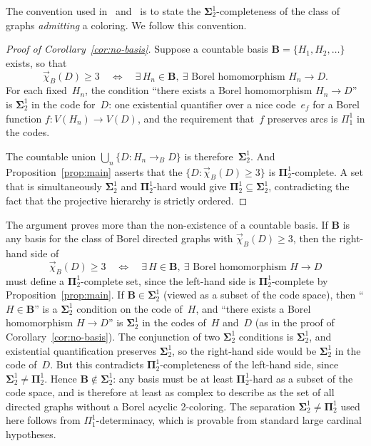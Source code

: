 \documentclass[12pt]{article}
\begin{document}
\begin{remark}\label{rmk:sigma-pi-convention}
The convention used in~\cite{Todorcevic_2021_ComplexProbBorel} and~\cite{thornton2022algebraic} is to state the $\mathbf\Sigma^1_2$-completeness of the class of graphs \emph{admitting} a coloring.
We follow this convention.
\end{remark}

\begin{proof}[Proof of Corollary~\ref{cor:no-basis}]
Suppose a countable basis $\mathbf{B} = \{H_1,H_2,\dots\}$ exists, so that
$$
	\vec\chi_B(D) \geq 3
	\quad\Longleftrightarrow\quad
	\exists\, H_n\in\mathbf{B},\ \exists\text{ Borel homomorphism } H_n\to D.
$$
For each fixed~$H_n$, the condition ``there exists a Borel homomorphism $H_n\to D$'' is $\mathbf\Sigma^1_2$ in the code for~$D$: one existential quantifier over a nice code~$e_f$ for a Borel function $f\colon V(H_n)\to V(D)$, and the requirement that~$f$ preserves arcs is $\Pi^1_1$ in the codes.

The countable union $\bigcup_n \{D : H_n\to_B D\}$ is therefore~$\mathbf\Sigma^1_2$.
And Proposition~\ref{prop:main} asserts that the $\{D : \vec\chi_B(D)\geq 3\}$ is $\mathbf\Pi^1_2$-complete.
A set that is simultaneously $\mathbf\Sigma^1_2$ and $\mathbf\Pi^1_2$-hard would give $\mathbf\Pi^1_2 \subseteq \mathbf\Sigma^1_2$, contradicting the fact that the projective hierarchy is strictly ordered.
\end{proof}

\begin{remark}\label{rmk:complexity-lower-bound}
The argument proves more than the non-existence of a countable basis.
If $\mathbf{B}$ is any basis for the class of Borel directed graphs with $\vec\chi_B(D)\geq 3$, then the right-hand side of
$$
	\vec\chi_B(D)\geq 3 \quad\Longleftrightarrow\quad \exists\, H\in\mathbf{B},\ \exists\text{ Borel homomorphism }H\to D
$$
must define a $\mathbf\Pi^1_2$-complete set, since the left-hand side is $\mathbf\Pi^1_2$-complete by Proposition~\ref{prop:main}.
If $\mathbf{B}\in\mathbf\Sigma^1_2$ (viewed as a subset of the code space), then ``$H\in\mathbf{B}$'' is a $\mathbf\Sigma^1_2$ condition on the code of~$H$, and ``there exists a Borel homomorphism $H\to D$'' is $\mathbf\Sigma^1_2$ in the codes of~$H$ and~$D$ (as in the proof of Corollary~\ref{cor:no-basis}).
The conjunction of two $\mathbf\Sigma^1_2$ conditions is $\mathbf\Sigma^1_2$, and existential quantification preserves $\mathbf\Sigma^1_2$, so the right-hand side would be $\mathbf\Sigma^1_2$ in the code of~$D$.
But this contradicts $\mathbf\Pi^1_2$-completeness of the left-hand side, since $\mathbf\Sigma^1_2\neq\mathbf\Pi^1_2$.
Hence $\mathbf{B}\notin\mathbf\Sigma^1_2$: any basis must be at least $\mathbf\Pi^1_2$-hard as a subset of the code space, and is therefore at least as complex to describe as the set of all directed graphs without a Borel acyclic 2-coloring.
The separation $\mathbf\Sigma^1_2\neq\mathbf\Pi^1_2$ used here follows from $\Pi^1_1$-determinacy, which is provable from standard large cardinal hypotheses.
\end{remark}
\end{document}
